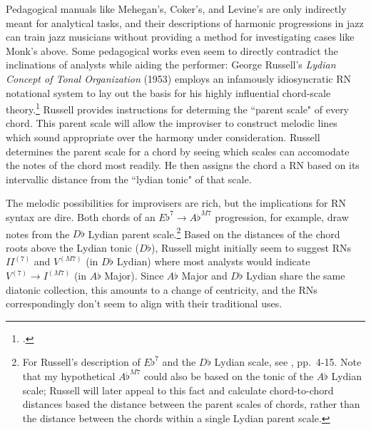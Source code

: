 Pedagogical manuals like Mehegan's, Coker's, and Levine's are only indirectly meant for analytical tasks, and their descriptions of harmonic progressions in jazz can train jazz musicians without providing a method for investigating cases like Monk's above.  Some pedagogical works even seem to directly contradict the inclinations of analysts while aiding the performer: George Russell's \emph{Lydian Concept of Tonal Organization} (1953) employs an infamously idiosyncratic RN notational system to lay out the basis for his highly influential chord-scale theory.\footnote{\cite{russell1953}.}  Russell provides instructions for determing the ``parent scale" of every chord.  This parent scale will allow the improviser to construct melodic lines which sound appropriate over the harmony under consideration.  Russell determines the parent scale for a chord by seeing which scales can accomodate the notes of the chord most readily.  He then assigns the chord a RN based on its intervallic distance from the ``lydian tonic" of that scale.

The melodic possibilities for improvisers are rich, but the implications for RN syntax are dire.  Both chords of an $E\flat^7 \rightarrow A\flat^{M7}$ progression, for example, draw notes from the $D\flat$ Lydian parent scale.\footnote{For Russell's description of $E\flat^7$ and the $D\flat$ Lydian scale, see \cite{russell1953}, pp.\ 4-15.  Note that my hypothetical $A\flat^{M7}$ could also be based on the tonic of the $A\flat$ Lydian scale; Russell will later appeal to this fact and calculate chord-to-chord distances based the distance between the parent scales of chords, rather than the distance between the chords within a single Lydian parent scale.}  Based on the distances of the chord roots above the Lydian tonic ($D\flat$), Russell might initially seem to suggest RNs $II^{(7)}$ and $V^{(M7)}$ (in $D\flat$ Lydian) where most analysts would indicate $V^{(7)} \rightarrow I^{(M7)}$ (in $A\flat$ Major).  Since $A\flat$ Major and $D\flat$ Lydian share the same diatonic collection, this amounts to a change of centricity, and the RNs correspondingly don't seem to align with their traditional uses.

